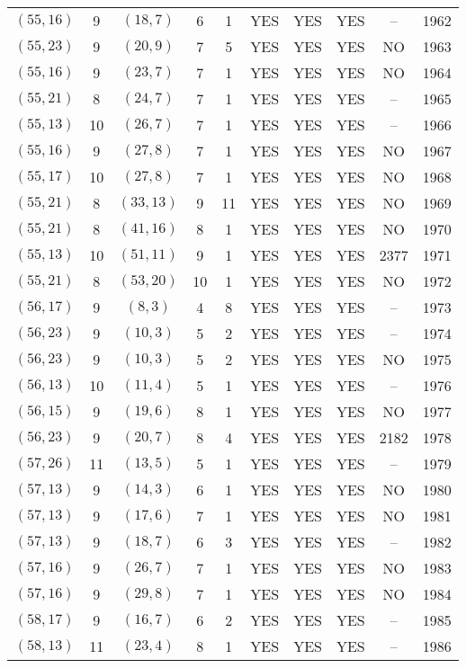 \begin{longtable}{|c|c|c|c|c|c|c|c|c|c|}
$(55, 16)$ & 9 & $(18, 7)$ & 6 & 1 & YES & YES & YES & -- & 1962\\
$(55, 23)$ & 9 & $(20, 9)$ & 7 & 5 & YES & YES & YES & NO & 1963\\
$(55, 16)$ & 9 & $(23, 7)$ & 7 & 1 & YES & YES & YES & NO & 1964\\
$(55, 21)$ & 8 & $(24, 7)$ & 7 & 1 & YES & YES & YES & -- & 1965\\
$(55, 13)$ & 10 & $(26, 7)$ & 7 & 1 & YES & YES & YES & -- & 1966\\
$(55, 16)$ & 9 & $(27, 8)$ & 7 & 1 & YES & YES & YES & NO & 1967\\
$(55, 17)$ & 10 & $(27, 8)$ & 7 & 1 & YES & YES & YES & NO & 1968\\
$(55, 21)$ & 8 & $(33, 13)$ & 9 & 11 & YES & YES & YES & NO & 1969\\
$(55, 21)$ & 8 & $(41, 16)$ & 8 & 1 & YES & YES & YES & NO & 1970\\
$(55, 13)$ & 10 & $(51, 11)$ & 9 & 1 & YES & YES & YES & 2377 & 1971\\
$(55, 21)$ & 8 & $(53, 20)$ & 10 & 1 & YES & YES & YES & NO & 1972\\
$(56, 17)$ & 9 & $(8, 3)$ & 4 & 8 & YES & YES & YES & -- & 1973\\
$(56, 23)$ & 9 & $(10, 3)$ & 5 & 2 & YES & YES & YES & -- & 1974\\
$(56, 23)$ & 9 & $(10, 3)$ & 5 & 2 & YES & YES & YES & NO & 1975\\
$(56, 13)$ & 10 & $(11, 4)$ & 5 & 1 & YES & YES & YES & -- & 1976\\
$(56, 15)$ & 9 & $(19, 6)$ & 8 & 1 & YES & YES & YES & NO & 1977\\
$(56, 23)$ & 9 & $(20, 7)$ & 8 & 4 & YES & YES & YES & 2182 & 1978\\
$(57, 26)$ & 11 & $(13, 5)$ & 5 & 1 & YES & YES & YES & -- & 1979\\
$(57, 13)$ & 9 & $(14, 3)$ & 6 & 1 & YES & YES & YES & NO & 1980\\
$(57, 13)$ & 9 & $(17, 6)$ & 7 & 1 & YES & YES & YES & NO & 1981\\
$(57, 13)$ & 9 & $(18, 7)$ & 6 & 3 & YES & YES & YES & -- & 1982\\
$(57, 16)$ & 9 & $(26, 7)$ & 7 & 1 & YES & YES & YES & NO & 1983\\
$(57, 16)$ & 9 & $(29, 8)$ & 7 & 1 & YES & YES & YES & NO & 1984\\
$(58, 17)$ & 9 & $(16, 7)$ & 6 & 2 & YES & YES & YES & -- & 1985\\
$(58, 13)$ & 11 & $(23, 4)$ & 8 & 1 & YES & YES & YES & -- & 1986\\

\end{longtable}

